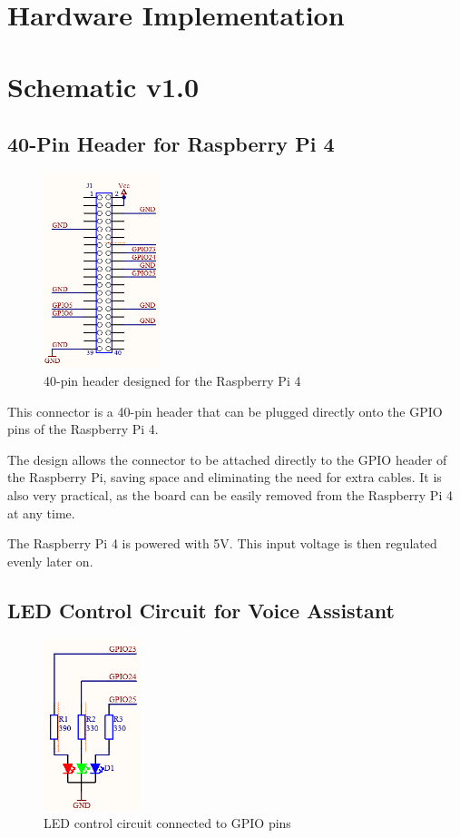 \section*{Hardware Implementation}

\section{Schematic v1.0}
\subsection{40-Pin Header for Raspberry Pi 4}

\begin{figure}[h]
    \centering
    \includegraphics[width=0.3\textwidth]{assets/Stecker}
    \caption{40-pin header designed for the Raspberry Pi 4}
    \label{fig:raspberry_header}
\end{figure}


This connector is a 40-pin header that can be plugged directly onto the GPIO pins of the Raspberry Pi 4.

The design allows the connector to be attached directly to the GPIO header of the Raspberry Pi, saving space and eliminating the need for extra cables. It is also very practical, as the board can be easily removed from the Raspberry Pi 4 at any time.

The Raspberry Pi 4 is powered with 5V. This input voltage is then regulated evenly later on.

\newpage

\subsection{LED Control Circuit for Voice Assistant}

\begin{figure}[h]
\centering
\includegraphics[width=0.25\textwidth]{assets/RGB}
\caption{LED control circuit connected to GPIO pins}
\label{fig:led_circuit}
\end{figure}


